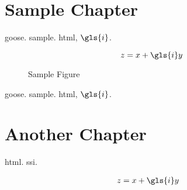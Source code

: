 \documentclass{book}
\begin{document}
\chapter{Sample Chapter}
\gls{goose}. \gls{sample}. \gls{html}, $\gls{i}$.

\begin{equation}
z = x + \gls{i}y\label{eq:sample}
\end{equation}

\begin{figure}[htbp]
\centering
{}
\caption{Sample Figure}
\end{figure}

\gls{goose}. \gls{sample}. \gls{html}, $\gls{i}$.

\chapter{Another Chapter}
\gls{html}.
\gls{ssi}.

\begin{align}
z &= x + \gls{i}y
\end{align}

\printunsrtglossaries
\end{document}

